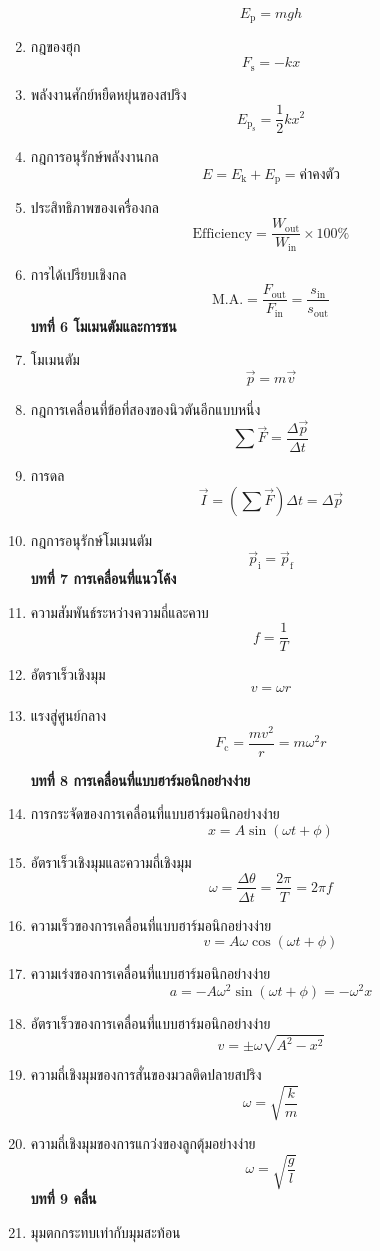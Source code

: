 \documentclass[12pt, a4paper]{article}
\begin{document}
\begin{enumerate}
		\[E_\text{p}=mgh\]
	\item กฎของฮุก
		\[F_\text{s}=-kx\]
	\item พลังงานศักย์หยืดหยุ่นของสปริง
		\[E_\mathrm{p_s}=\frac{1}{2}kx^2\]
	\item กฎการอนุรักษ์พลังงานกล
		\[ E=E_\text{k}+E_\text{p}= \text{ค่าคงตัว}\]
	\item ประสิทธิภาพของเครื่องกล
		\[\text{Efficiency}=\frac{W_{\text{out}}}{W_{\text{in}}}\times100\%\]
	\item การได้เปรียบเชิงกล
		\[\text{M.A.}=\frac{F_\text{out}}{F_\text{in}}=\frac{s_\text{in}}{s_\text{out}}\]
	\textbf{บทที่ 6 โมเมนตัมและการชน}
	\item โมเมนตัม
		\[\vec{p}=m\vec{v}\]
	\item กฎการเคลื่อนที่ข้อที่สองของนิวตันอีกแบบหนึ่ง
		\[\sum \vec{F}=\frac{\Delta \vec{p}}{\Delta t}\]
	\item การดล
		\[\vec{I}=\left(\sum \vec{F} \right) \Delta t=\Delta \vec{p}\]
	\item กฎการอนุรักษ์โมเมนตัม
		\[\vec{p}_\text{i}=\vec{p}_\text{f}\]
	\textbf{บทที่ 7 การเคลื่อนที่แนวโค้ง}
	\item ความสัมพันธ์ระหว่างความถี่และคาบ
		\[f=\frac{1}{T}\]
	\item อัตราเร็วเชิงมุม
		\[v=\omega r\]
	\item แรงสู่ศูนย์กลาง
	\[F_\text{c}=\frac{mv^2}{r}=m\omega^2r\]
	\begin{center}
	\end{center}
	\textbf{บทที่ 8 การเคลื่อนที่แบบฮาร์มอนิกอย่างง่าย}
	\item การกระจัดของการเคลื่อนที่แบบฮาร์มอนิกอย่างง่าย
		\[x=A\sin(\omega t+\phi)\]
	\item อัตราเร็วเชิงมุมและความถี่เชิงมุม
		\[\omega=\frac{\Delta \theta}{\Delta t}=\frac{2\pi}{T}=2\pi f\]
	\item ความเร็วของการเคลื่อนที่แบบฮาร์มอนิกอย่างง่าย
		\[v=A\omega\cos(\omega t +\phi)\]
	\item ความเร่งของการเคลื่อนที่แบบฮาร์มอนิกอย่างง่าย
		\[a=-A\omega^2\sin(\omega t +\phi)=-\omega^2x\]
	\item อัตราเร็วของการเคลื่อนที่แบบฮาร์มอนิกอย่างง่าย
		\[v=\pm\omega\sqrt{A^2-x^2}\]
	\item ความถี่เชิงมุมของการสั่นของมวลติดปลายสปริง
		\[\omega=\sqrt{\frac{k}{m}}\]
	\item ความถี่เชิงมุมของการแกว่งของลูกตุ้มอย่างง่าย
		\[\omega=\sqrt{\frac{g}{l}}\]
	\textbf{บทที่ 9 คลื่น}
	\item มุมตกกระทบเท่ากับมุมสะท้อน

\end{enumerate}
\end{document}
